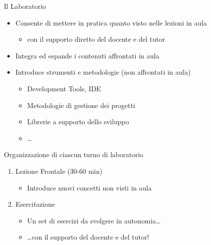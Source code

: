 \documentclass[presentation]{beamer}
\begin{document}
\begin{frame}{Il Laboratorio}

\begin{itemize}
\item Consente di mettere in pratica quanto visto nelle lezioni in aula
\begin{itemize}
\item con il supporto diretto del docente e del tutor
\end{itemize}
\item Integra ed espande i contenuti affrontati in aula
\item Introduce strumenti e metodologie (non affrontati in aula)
\begin{itemize}
\item Development Tools, IDE
\item Metodologie di gestione dei progetti
\item Librerie a supporto dello sviluppo
\item \dots
\end{itemize}
\end{itemize}

\begin{block}{Organizzazione di ciascun turno di laboratorio}
\begin{enumerate}
\item Lezione Frontale (30-60 min)
\begin{itemize}
\item Introduce nuovi concetti non visti in aula
\end{itemize}
\item Esercitazione
\begin{itemize}
\item Un set di esercizi da svolgere in autonomia\dots
\item \dots con il supporto del docente e del tutor!
\end{itemize}
\end{enumerate}
\end{block}

\end{frame}
\end{document}

